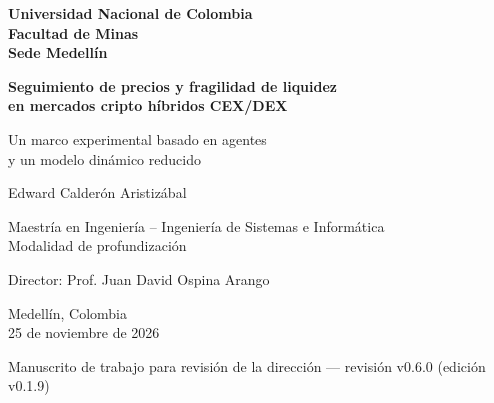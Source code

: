 \documentclass[11pt,letterpaper]{report}
\newcommand{\versionTesis}{v0.1.9}
\newcommand{\revisionManuscrito}{v0.6.0}
\numberwithin{equation}{chapter}
\begin{document}
\begin{titlepage}
  \thispagestyle{empty}
  \centering
  \singlespacing
  {\large\bfseries Universidad Nacional de Colombia\\[2pt]
  Facultad de Minas\\[2pt]
  Sede Medellín\par}
  \vspace{3.2cm}
  {\LARGE\bfseries Seguimiento de precios y fragilidad de liquidez\\
  en mercados cripto híbridos CEX/DEX\par}
  \vspace{0.9cm}
  {\Large Un marco experimental basado en agentes\\
  y un modelo dinámico reducido\par}
  \vspace{2.6cm}
  {\Large Edward Calderón Aristizábal\par}
  \vspace{1.6cm}
  {\large Maestría en Ingeniería -- Ingeniería de Sistemas e Informática\\[2pt]
  Modalidad de profundización\par}
  \vspace{0.8cm}
  {\large Director: Prof. Juan David Ospina Arango\par}
  \vfill
  {\large Medellín, Colombia\\[2pt]
  25 de noviembre de 2026\par}
  \vspace{0.3cm}
  {\small Manuscrito de trabajo para revisión de la dirección --- revisión \revisionManuscrito{} (edición \versionTesis{})\par}
\end{titlepage}

\setcounter{page}{1}

\begingroup
\setcounter{secnumdepth}{-1}
\titleformat{\section}{\Large\bfseries}{}{0pt}{}
\singlespacing

\clearpage

\endgroup
\setcounter{secnumdepth}{2}
\end{document}
